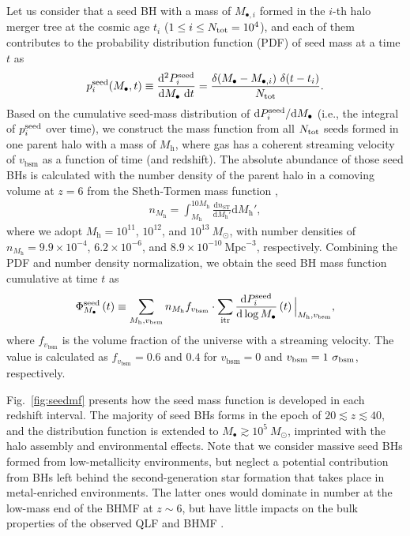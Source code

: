 \documentclass[twocolumn, twocolappendix]{aastex63}
\newcommand{\Msun}{M_\odot}
\newcommand{\Mh}{M_\mathrm{h}}
\newcommand{\Mbh}{M_\bullet}
\newcommand{\vbsm}{v_\mathrm{bsm}}
\newcommand{\D}{\mathrm{d}}
\begin{document}
\begin{CJK*}{UTF8}{gbsn}
Let us consider that a seed BH with a mass of $M_{\bullet,i}$ formed in the $i$-th halo merger tree at the cosmic age 
$t_i$ ($1\leq i \leq N_{\rm tot}=10^4$),
and each of them contributes to the probability distribution function (PDF) of seed mass at a time $t$ as
% 
\begin{equation}
  p^{\rm seed}_i (\Mbh,t)\equiv \frac{\D^2 P^{\rm seed}_i}{\D \Mbh ~\D t}= \frac{ \delta(\Mbh-M_{\bullet,i})~ \delta(t-t_i)}{N_{\rm tot}}.
\end{equation}
%
Based on the cumulative seed-mass distribution of $\D P^{\rm seed}_i/ \D \Mbh$
(i.e., the integral of $p^{\rm seed}_i$ over time),
we construct the mass function from all $N_{\rm tot}$ seeds formed in one parent halo
with a mass of $\Mh$, where gas has a coherent streaming velocity of $\vbsm$ as a function of time (and redshift).
The absolute abundance of those seed BHs is calculated with the number density of the parent halo in a comoving volume at $z=6$ 
from the Sheth-Tormen mass function \citep{2001MNRAS.323....1S},
%
\begin{align}
  n_{\Mh}= \int_{\Mh}^{10\Mh}  \frac{\D n_{\mathrm{ST}}} {\D \Mh'} \D \Mh', 
\end{align}
%
where we adopt $\Mh = 10^{11}$, $10^{12}$, and $10^{13}~\Msun$, with number densities of
$n_{\Mh} = 9.9\times 10^{-4}$, $6.2\times 10^{-6}$, and $8.9\times 10^{-10}~ \text{Mpc}^{-3}$, respectively.
Combining the PDF and number density normalization, we obtain the seed BH mass function cumulative at time $t$ as
%
\begin{align}
\Phi_{\Mbh}^{\rm seed}\left(t\right) \equiv \sum_{\Mh, \vbsm} n_{\Mh} f_{\vbsm} 
\cdot \sum_{\rm itr} \frac{\D P^{\rm seed}_i}{\D \log \Mbh}\left(t\right) \Big| _{\Mh, \vbsm},
\end{align}
%
where $f_{\vbsm}$ is the volume fraction of the universe with a streaming velocity.
The value is calculated as $f_{\vbsm} = 0.6$ and $0.4$ for $\vbsm = 0$ and $\vbsm=1~\sigma_{\rm bsm}$, respectively.

Fig.~\ref{fig:seedmf} presents how the seed mass function is developed in each redshift interval.
The majority of seed BHs forms in the epoch of $20\lesssim z \lesssim 40$, and the distribution function is 
extended to $M_\bullet \gtrsim 10^5~\Msun$, imprinted with the halo assembly and environmental effects.
Note that we consider massive seed BHs formed from low-metallicity environments,
but neglect a potential contribution from BHs left behind the second-generation star formation
that takes place in metal-enriched environments.
The latter ones would dominate in number at the low-mass end of the BHMF at $z\sim 6$,
but have little impacts on the bulk properties of the observed QLF and BHMF \citep[see][]{2022MNRAS.511..616T}.




\end{CJK*}
\end{document}
